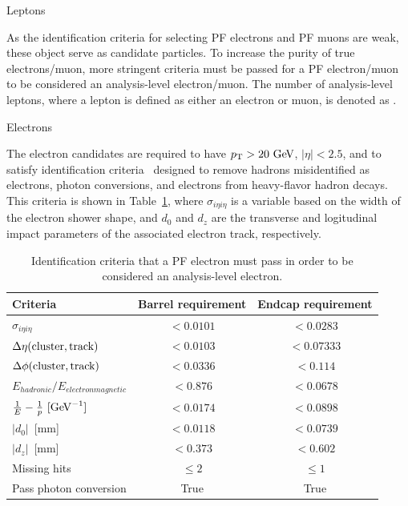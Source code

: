 \begin{section}{Leptons}

As the identification criteria for selecting PF electrons and PF muons are weak, these object serve as candidate particles. 
To increase the purity of true electrons/muon, more stringent criteria must be passed for a PF electron/muon to be considered an analysis-level electron/muon.
The number of analysis-level leptons, where a lepton is defined as either an electron or muon, is denoted as \Nleps.

\begin{subsection}{Electrons}

The electron candidates are required to have $p_{\mathrm{T}} > 20~\mathrm{Ge\kern -0.1em V}$, $|\eta| < 2.5$, and to satisfy identification criteria~\cite{electron_id} designed to remove hadrons misidentified as electrons, photon conversions, and electrons from heavy-flavor hadron decays. 
This criteria is shown in Table~\ref{tab:electron_id}, where $\sigma_{i\eta i\eta}$ is a variable based on the width of the electron shower shape, and $d_0$ and $d_z$ are the transverse and logitudinal impact parameters of the associated electron track, respectively.

\begin{table}[tb!]
\centering
\begin{tabular}{l|cc}
\hline \hline
Criteria                                 &  Barrel requirement  & Endcap requirement \\
\hline
$\sigma_{i\eta i\eta}$                   &  $< 0.0101$          &  $< 0.0283 $       \\
$\Delta\eta\mathrm{(cluster,track)}$        &  $< 0.0103$          &  $< 0.07333$       \\
$\Delta\phi\mathrm{(cluster,track)}$        &  $< 0.0336$          &  $< 0.114  $       \\
$E_{hadronic}/E_{electronmagnetic}$      &  $< 0.876 $          &  $< 0.0678 $       \\
$\frac{1}{E} - \frac{1}{p}~[\mathrm{Ge\kern -0.1em V}^{-1}]$  &  $< 0.0174$          &  $< 0.0898 $       \\
$|d_0|$~[mm]                             &  $< 0.0118$          &  $< 0.0739 $       \\
$|d_z|$~[mm]                             &  $< 0.373 $          &  $< 0.602  $       \\
Missing hits                             &  $\leq 2  $          &  $\leq 1   $       \\
Pass photon conversion                   & True                 & True               \\
\hline \hline
\end{tabular}
\caption{Identification criteria that a PF electron must pass in order to be considered an analysis-level electron.}
\label{tab:electron_id}
\end{table}


\end{subsection}
\end{section}
